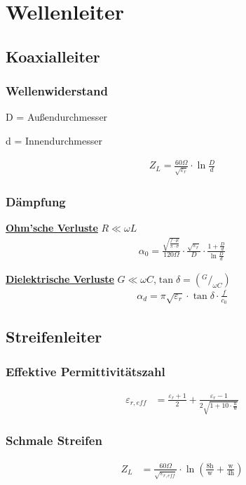 \section{Wellenleiter}
\subsection{Koaxialleiter}
\subsubsection{Wellenwiderstand}


D = Außendurchmesser

d = Innendurchmesser

\begin{align*}
    Z_L = \frac{60\Omega}{\sqrt{\varepsilon_r}}\cdot \ln{\frac{D}{d}}
\end{align*}

\subsubsection{Dämpfung}
\underline{\textbf{Ohm'sche Verluste}} $R\ll\omega L$
\begin{align*}
    \alpha_0 = \frac{\sqrt{\frac{f\cdot\mu}{\pi\cdot\sigma}}}{120\Omega}\cdot\frac{\sqrt{\varepsilon_r}}{D}\cdot\frac{1+\frac{D}{d}}{\ln \frac{D}{d}}
\end{align*}

\underline{\textbf{Dielektrische Verluste}} $G\ll\omega C$,$\tan\delta= (^G/_{\omega C})$
\begin{align*}
    \alpha_d = \pi\sqrt{\varepsilon_r}\cdot\tan\delta\cdot\frac{f}{c_0}
\end{align*}
\subsection{Streifenleiter}

\subsubsection{Effektive Permittivitätszahl}
\begin{align*}
    \varepsilon_{r,eff} & = \frac{\varepsilon_r+1}{2}+\frac{\varepsilon_r-1}{2\sqrt{1+10\cdot\frac{\text{h}}{\text{w}}}}
\end{align*}
\subsubsection{Schmale Streifen}
\begin{align*}
    Z_L & = \frac{60\Omega}{\sqrt{\varepsilon_{r,eff}}}\cdot\ln\left(\frac{8\text{h}}{\text{w}}+\frac{\text{w}}{4\text{h}}\right)
\end{align*}
